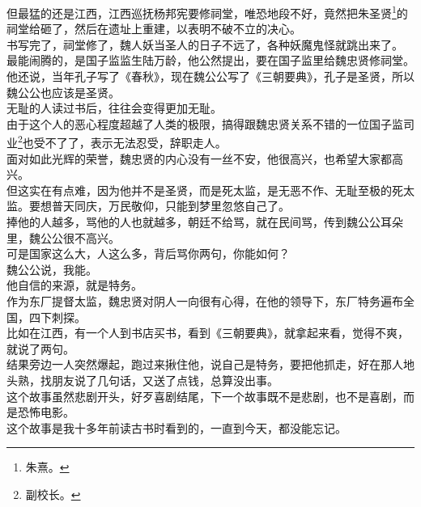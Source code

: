 \begin{multicols}{\theparacolNo}
但最猛的还是江西，江西巡抚杨邦宪要修祠堂，唯恐地段不好，竟然把朱圣贤\footnote{朱熹。}的祠堂给砸了，然后在遗址上重建，以表明不破不立的决心。\\

书写完了，祠堂修了，魏人妖当圣人的日子不远了，各种妖魔鬼怪就跳出来了。\\

最能闹腾的，是国子监监生陆万龄，他公然提出，要在国子监里给魏忠贤修祠堂。他还说，当年孔子写了《春秋》，现在魏公公写了《三朝要典》，孔子是圣贤，所以魏公公也应该是圣贤。\\

无耻的人读过书后，往往会变得更加无耻。\\

由于这个人的恶心程度超越了人类的极限，搞得跟魏忠贤关系不错的一位国子监司业\footnote{副校长。}也受不了了，表示无法忍受，辞职走人。\\

面对如此光辉的荣誉，魏忠贤的内心没有一丝不安，他很高兴，也希望大家都高兴。\\

但这实在有点难，因为他并不是圣贤，而是死太监，是无恶不作、无耻至极的死太监。要想普天同庆，万民敬仰，只能到梦里忽悠自己了。\\

捧他的人越多，骂他的人也就越多，朝廷不给骂，就在民间骂，传到魏公公耳朵里，魏公公很不高兴。\\

可是国家这么大，人这么多，背后骂你两句，你能如何？\\

魏公公说，我能。\\

他自信的来源，就是特务。\\

作为东厂提督太监，魏忠贤对阴人一向很有心得，在他的领导下，东厂特务遍布全国，四下刺探。\\

比如在江西，有一个人到书店买书，看到《三朝要典》，就拿起来看，觉得不爽，就说了两句。\\

结果旁边一人突然爆起，跑过来揪住他，说自己是特务，要把他抓走，好在那人地头熟，找朋友说了几句话，又送了点钱，总算没出事。\\

这个故事虽然悲剧开头，好歹喜剧结尾，下一个故事既不是悲剧，也不是喜剧，而是恐怖电影。\\

这个故事是我十多年前读古书时看到的，一直到今天，都没能忘记。\\


\end{multicols}
